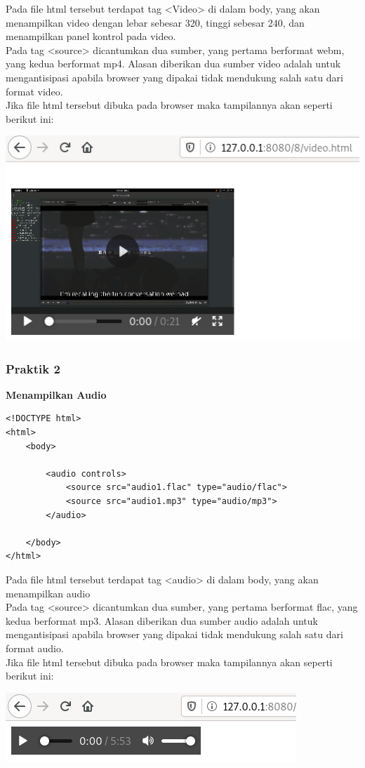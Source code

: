 \documentclass[a4paper,12pt]{article}
\begin{document}
Pada file html tersebut terdapat tag <Video> di dalam body, yang akan menampilkan video dengan lebar sebesar 320, 
tinggi sebesar 240, dan menampilkan panel kontrol pada video.\\
Pada tag <source> dicantumkan dua sumber, yang pertama berformat webm, yang kedua berformat mp4. Alasan diberikan dua
sumber video adalah untuk mengantisipasi apabila browser yang dipakai tidak mendukung salah satu dari format video.\\

Jika file html tersebut dibuka pada browser maka tampilannya akan seperti berikut ini:
\begin{center}
    \includegraphics[width=.8\linewidth]{1.png} 
\end{center}

\subsubsection{Praktik 2}
\textbf{Menampilkan Audio\\}
\begin{lstlisting}[style=htmlcssjs]
<!DOCTYPE html>
<html>
    <body>

        <audio controls>
            <source src="audio1.flac" type="audio/flac">
            <source src="audio1.mp3" type="audio/mp3">
        </audio>

    </body>
</html>
\end{lstlisting}

Pada file html tersebut terdapat tag <audio> di dalam body, yang akan menampilkan audio\\
Pada tag <source> dicantumkan dua sumber, yang pertama berformat flac, yang kedua berformat mp3. Alasan diberikan dua
sumber audio adalah untuk mengantisipasi apabila browser yang dipakai tidak mendukung salah satu dari format audio.\\

Jika file html tersebut dibuka pada browser maka tampilannya akan seperti berikut ini:
\begin{center}
    \includegraphics[width=.8\linewidth]{2.png} 
\end{center}
\end{document}
